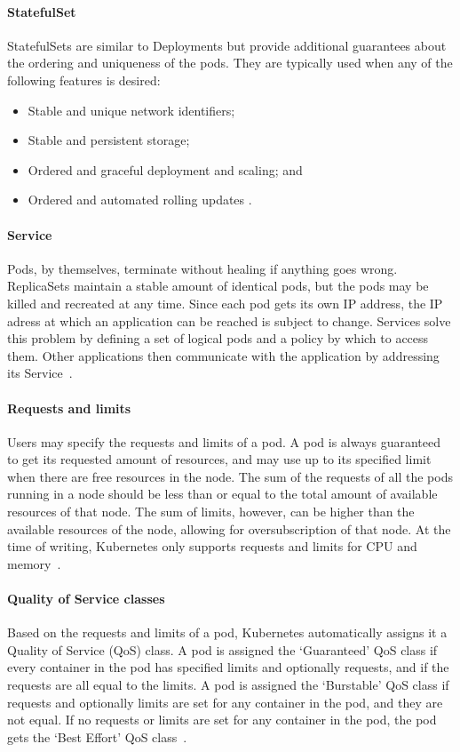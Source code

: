 \paragraph{StatefulSet}
StatefulSets are similar to Deployments but provide additional guarantees about the ordering and uniqueness of the pods. They are typically used when any of the following features is desired:
\begin{itemize}
    \item Stable and unique network identifiers;
    \item Stable and persistent storage;
    \item Ordered and graceful deployment and scaling; and
    \item Ordered and automated rolling updates \cite{Kubernetes-StatefulSet}.
\end{itemize}

\paragraph{Service}
Pods, by themselves, terminate without healing if anything goes wrong. ReplicaSets maintain a stable amount of identical pods, but the pods may be killed and recreated at any time. Since each pod gets its own IP address, the IP adress at which an application can be reached is subject to change. Services solve this problem by defining a set of logical pods and a policy by which to access them. Other applications then communicate with the application by addressing its Service~\citep{Kubernetes-Service}.

\paragraph{Requests and limits}
Users may specify the requests and limits of a pod. A pod is always guaranteed to get its requested amount of resources, and may use up to its specified limit when there are free resources in the node. The sum of the requests of all the pods running in a node should be less than or equal to the total amount of available resources of that node. The sum of limits, however, can be higher than the available resources of the node, allowing for oversubscription of that node. At the time of writing, Kubernetes only supports requests and limits for CPU and memory~\citep{requestlimit}.

\paragraph{Quality of Service classes}
Based on the requests and limits of a pod, Kubernetes automatically assigns it a Quality of Service (QoS) class. A pod is assigned the `Guaranteed' QoS class if every container in the pod has specified limits and optionally requests, and if the requests are all equal to the limits. A pod is assigned the `Burstable' QoS class if requests and optionally limits are set for any container in the pod, and they are not equal. If no requests or limits are set for any container in the pod, the pod gets the `Best Effort' QoS class~\citep{QoS}.

